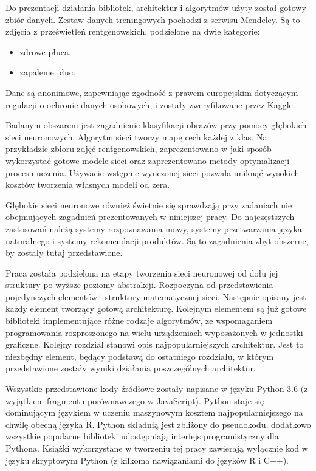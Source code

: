 \documentclass[12pt,a4paper,twoside,titlepage,openright]{book}
\begin{document}
Do prezentacji działania bibliotek, architektur i algorytmów użyty został gotowy zbiór danych. Zestaw danych treningowych pochodzi z serwisu Mendeley. Są to zdjęcia z prześwietleń rentgenowskich, podzielone na dwie kategorie:
\begin{itemize}
\item zdrowe płuca,
\item zapalenie płuc.
\end{itemize} 
Dane są anonimowe, zapewniając zgodność z prawem europejskim dotyczącym regulacji o ochronie danych osobowych, i zostały zweryfikowane przez Kaggle.\cite{siteMendeley}

Badanym obszarem jest zagadnienie klasyfikacji obrazów przy pomocy głębokich sieci neuronowych. Algorytm sieci tworzy mapę cech każdej z klas. Na przykładzie zbioru zdjęć rentgenowskich, zaprezentowano w jaki sposób wykorzystać gotowe modele sieci oraz zaprezentowano metody optymalizacji procesu uczenia. Używacie wstępnie wyuczonej sieci pozwala uniknąć wysokich kosztów tworzenia własnych modeli od zera.

Głębokie sieci neuronowe również świetnie się sprawdzają przy zadaniach nie obejmujących zagadnień prezentowanych w niniejszej pracy. Do najczęstszych zastosowań należą systemy rozpoznawania mowy, systemy przetwarzania języka naturalnego i systemy rekomendacji produktów. Są to zagadnienia zbyt obszerne, by zostały tutaj przedstawione.

Praca została podzielona na etapy tworzenia sieci neuronowej od dołu jej struktury po wyższe poziomy abstrakcji. Rozpoczyna od przedstawienia pojedynczych elementów i struktury matematycznej sieci. Następnie opisany jest każdy element tworzący gotową architekturę. Kolejnym elementem są już gotowe biblioteki implementujące różne rodzaje algorytmów, ze wspomaganiem programowania rozproszonego na wielu urządzeniach wyposażonych w jednostki graficzne. Kolejny rozdział stanowi opis najpopularniejszych architektur. Jest to niezbędny element, będący podstawą do ostatniego rozdziału, w którym przedstawione zostały wyniki działania poszczególnych architektur.

Wszystkie przedstawione kody źródłowe zostały napisane w języku Python 3.6 (z wyjątkiem fragmentu porównawczego w JavaScript). Python staje się dominującym językiem w uczeniu maszynowym kosztem najpopularniejszego na chwilę obecną języka R. \cite{sitePythonvR} Python składnią jest zbliżony do pseudokodu, dodatkowo wszystkie popularne biblioteki udostępniają interfejs programistyczny dla Pythona. Książki wykorzystane w tworzeniu tej pracy zawierają wyłącznie kod w języku skryptowym Python (z kilkoma nawiązaniami do języków R i C++).
\end{document}
